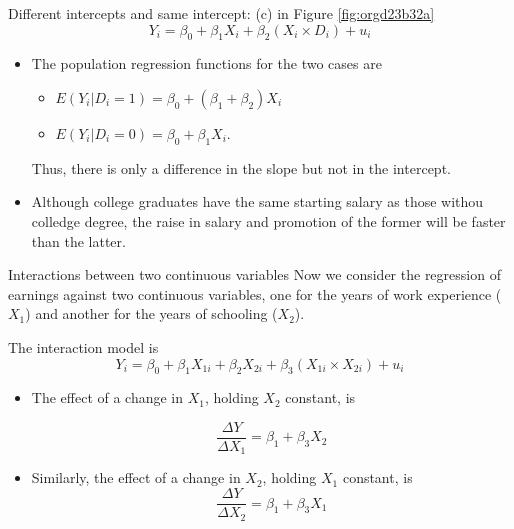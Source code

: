 \documentclass[presentation,10pt]{beamer}
\begin{document}
\begin{frame}[label={sec:orga9b7622}]{Different intercepts and same intercept: (c) in Figure \ref{fig:orgd23b32a}}
\begin{equation}
\label{eq:interact-dx-c}
Y_i = \beta_0 + \beta_1 X_i + \beta_2 (X_i \times D_i) + u_i
\end{equation}

\begin{itemize}
\item The population regression functions for the two cases are
\begin{itemize}
\item \(E(Y_i|D_i=1) = \beta_0 + (\beta_1 + \beta_2) X_i\)
\item \(E(Y_i|D_i=0) = \beta_0 + \beta_1 X_i\).
\end{itemize}
Thus, there is only a difference in the slope but not in the
intercept.

\item Although college graduates have the same starting salary as those
withou colledge degree, the raise in salary and promotion of the
former will be faster than the latter.
\end{itemize}
\end{frame}

\begin{frame}[label={sec:orge7c31cf}]{Interactions between two continuous variables}
Now we consider the regression of earnings against two continuous
variables, one for the years of work experience (\(X_1\)) and another
for the years of schooling (\(X_2\)).

\vspace{0.2cm}
The interaction model is
\begin{equation}
\label{eq:interact-xx}
Y_i = \beta_0 + \beta_1 X_{1i} + \beta_2 X_{2i} + \beta_3 (X_{1i} \times X_{2i}) + u_i
\end{equation}
\begin{itemize}
\item The effect of a change in \(X_1\), holding \(X_2\) constant, is

\[ \frac{\Delta Y}{\Delta X_1} = \beta_1 + \beta_3 X_2 \]
\item Similarly, the effect of a change in \(X_2\), holding \(X_1\) constant, is
\[ \frac{\Delta Y}{\Delta X_2} = \beta_1 + \beta_3 X_1 \]
\end{itemize}
\end{frame}
\end{document}
